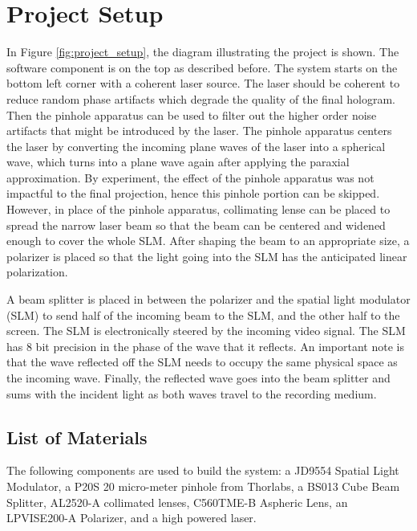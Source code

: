 \documentclass[12pt]{article}
\begin{document}
\newpage
\section{Project Setup}

In Figure \ref{fig:project_setup}, the diagram illustrating the project is shown. The software component is on the top as described before. The system starts on the bottom left corner with a coherent laser source. The laser should be coherent to reduce random phase artifacts which degrade the quality of the final hologram. Then the pinhole apparatus can be used to filter out the higher order noise artifacts that might be introduced by the laser. The pinhole apparatus centers the laser by converting the incoming plane waves of the laser into a spherical wave, which turns into a plane wave again after applying the paraxial approximation. By experiment, the effect of the pinhole apparatus was not impactful to the final projection, hence this pinhole portion can be skipped. However, in place of the pinhole apparatus, collimating lense can be placed to spread the narrow laser beam so that the beam can be centered and widened enough to cover the whole SLM. After shaping the beam to an appropriate size, a polarizer is placed so that the light going into the SLM has the anticipated linear polarization.

A beam splitter is placed in between the polarizer and the spatial light modulator (SLM) to send half of the incoming beam to the SLM, and the other half to the screen. The SLM is electronically steered by the incoming video signal. The SLM has 8 bit precision in the phase of the wave that it reflects. An important note is that the wave reflected off the SLM needs to occupy the same physical space as the incoming wave. Finally, the reflected wave goes into the beam splitter and sums with the incident light as both waves travel to the recording medium.

\subsection{List of Materials}
The following components are used to build the system: a JD9554 Spatial Light Modulator, a P20S 20 micro-meter pinhole from Thorlabs, a BS013 Cube Beam Splitter, AL2520-A collimated lenses, C560TME-B Aspheric Lens, an LPVISE200-A Polarizer, and a high powered laser.
\end{document}
